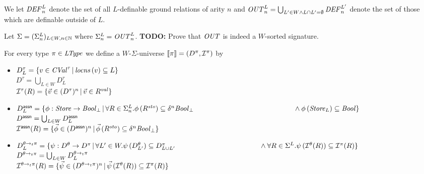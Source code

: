 \documentclass[12pt,a4paper]{report}
\begin{document}
We let $\mathit{DEF}^L_n$ denote the set of all $L$-definable ground relations
of arity $n$ and $\mathit{OUT}^L_n = \bigcup_{L'\in W\wedge L \cap L' = \emptyset} \mathit{DEF}^{L'}_n$ denote
the set of those which are definable outside of $L$.

Let $\Sigma = (\Sigma^L_n)_{L\in W,n\in \mathbb N}$ where $\Sigma^L_n = \mathit{OUT}^L_n$.
{\bf TODO:} Prove that $\mathit{OUT}$ is indeed a $W$-sorted signature.

\begin{definition}
  For every type $\pi\in\mathit{LType}$ we define a $W$-$\Sigma$-universe $\llbracket\pi\rrbracket=(D^\pi,\mathcal{I}^\pi)$ by
  \begin{itemize}
    \item $D^\tau_L = \{v\in\mathit{CVal}^\tau\,|\,\mathit{locns}\,(v)\subseteq L\}$ \\
          $D^\tau = \bigcup_{L\in W} D^\tau_L$ \\
          $\mathcal{I}^\tau(R) = \{\vec{v}\in(D^\tau)^n\,|\,\vec{v}\in R^{\mathit{val}}\}$

    \item $D^\tassn_L = \{ \phi:\Store\to\Bool_\bot\,|\,
                              \forall R\in\Sigma^L_n.\phi\,(R^\sto) \subseteq \delta^n\Bool_\bot \\
                              \hspace*{5cm} \wedge \phi\,(\Store_L) \subseteq \Bool
                         \}$ \\
          $D^{\mathsf{assn}} = \bigcup_{L\in W} D^{\mathsf{assn}}_L$ \\
          $\mathcal{I}^{\mathsf{assn}}(R) = \{ \vec{\phi} \in (D^{\mathsf{assn}})^n\,|\,
                                  \vec{\phi}\,(R^{\mathit{sto}}) \subseteq \delta^n \mathit{Bool}_\bot \}$

    \item $D^{\ttarrow{\theta}{\pi}}_L = \{ \psi:D^\theta \to D^\pi\,|\,
                              \forall L'\in W. \psi\,(D^\theta_{L'}) \subseteq D^\pi_{L \cup L'} \\
                              \hspace*{4.2cm} \wedge \forall R\in\Sigma^L. \psi\,(\I^\theta(R))\subseteq\I^\pi(R)\}$ \\
          $D^{\theta\rightarrow_t\pi} = \bigcup_{L\in W} D^{\theta\rightarrow_t\pi}_L$ \\
          $\mathcal{I}^{\theta\rightarrow_t\pi}(R) = \{ \vec{\psi} \in (D^{\theta\rightarrow_t\pi})^n\,|\,
                                          \vec{\psi}\,(\mathcal{I}^\theta(R)) \subseteq \mathcal{I}^\pi(R) \}$
  \end{itemize}
\end{definition}
\end{document}
